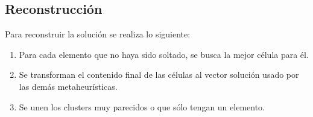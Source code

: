 \subsection{Reconstrucción}

    Para reconstruir la solución se realiza lo siguiente:
\begin{enumerate}
    \item Para cada elemento que no haya sido soltado, se busca la mejor
célula para él.
    \item Se transforman el contenido final de las células al vector solución
usado por las demás metaheurísticas.
    \item Se unen los clusters muy parecidos o que sólo tengan un elemento.
\end{enumerate}


